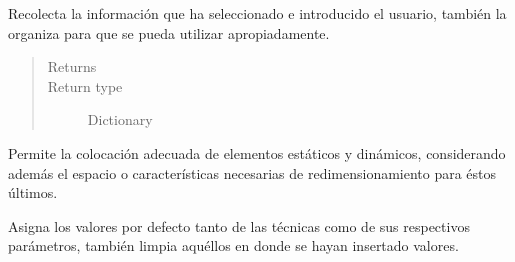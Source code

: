 \documentclass[letterpaper,10pt,english]{sphinxmanual}
\begin{document}
\begin{fulllineitems}

\begin{fulllineitems}
\label{View/Main/Population/TemplatePopulation/TemplatePopulationFrame:View.Main.Population.TemplatePopulation.TemplatePopulationFrame.TemplatePopulationFrame.get_information}
Recolecta la información que ha seleccionado e introducido el usuario,
también la organiza para que se pueda utilizar apropiadamente.
\begin{quote}\begin{description}
\item[{Returns}] \leavevmode



\item[{Return type}] \leavevmode
Dictionary

\end{description}\end{quote}

\end{fulllineitems}


\begin{fulllineitems}
\label{View/Main/Population/TemplatePopulation/TemplatePopulationFrame:View.Main.Population.TemplatePopulation.TemplatePopulationFrame.TemplatePopulationFrame.grid_widgets}
Permite la colocación adecuada de elementos estáticos y dinámicos, 
considerando además el espacio o características necesarias de redimensionamiento 
para éstos últimos.

\end{fulllineitems}


\begin{fulllineitems}
\label{View/Main/Population/TemplatePopulation/TemplatePopulationFrame:View.Main.Population.TemplatePopulation.TemplatePopulationFrame.TemplatePopulationFrame.restore_settings}
Asigna los valores por defecto tanto de las técnicas como de sus 
respectivos parámetros, también limpia aquéllos en donde se hayan 
insertado valores.

\end{fulllineitems}


\end{fulllineitems}
\end{document}
